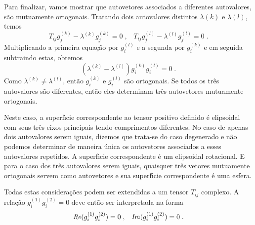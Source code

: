 Para finalizar, vamos mostrar que autovetores associados a
diferentes autovalores, s\~ao mutuamente ortogonais. Tratando dois
autovalores distintos $\lambda{(k)}$ e $\lambda{(l)}$, temos
\begin{equation}
   T_{ij} g_j^{(k)}- \lambda^{(k)} g_j^{(k)}=0 \;, \;\;\; T_{ij} g_j^{(l)}- \lambda^{(l)}
   g_j^{(l)}=0 \;.
   \label{auto_4_orto}
\end{equation}
Multiplicando a primeira equa\c{c}\~ao por $g_i^{(l)}$ e a segunda
por $g_i^{(k)}$ e em seguida subtraindo estas, obtemos
\begin{equation}
   (\lambda^{(k)}-\lambda^{(l)})g_i^{(k)}g_i^{(l)}=0 \;.
   \label{auto_4_orto1}
\end{equation}
Como $\lambda^{(k)} \neq \lambda^{(l)}$, ent\~ao $g_i^{(k)}$ e
$g_i^{(l)}$ s\~ao ortogonais. Se todos os tr\^es autovalores s\~ao
diferentes, ent\~ao eles determinam tr\^es autovetores mutuamente
ortogonais.

Neste caso, a superf\'{\i}cie correspondente ao tensor positivo
definido \'e elipsoidal com seus tr\^es eixos principais tendo
comprimentos diferentes. No caso de apenas dois autovalores serem
iguais, dizemos que trata-se do caso degenerado e n\~ao podemos
determinar de maneira \'unica os autovetores associados a esses
autovalores repetidos. A superf\'{\i}cie correspondente \'e um
elipsoidal rotacional. E para o caso dos tr\^es autovalores serem
iguais, quaisquer tr\^es vetores mutuamente ortogonais servem como
autovetores e sua superf\'{\i}cie correspondente \'e uma esfera.

Todas estas considera\c{c}\~oes podem ser extendidas a um tensor
$T_{ij}$ complexo. A rela\c{c}\~ao $g_i^{(1)}g_i^{(2)}=0$ deve
ent\~ao ser interpretada na forma
\begin{equation}
   \mathrm{\it Re}(g_i^{(1)}g_i^{(2)})=0\;, \;\;\; \mathrm{\it Im}(g_i^{(1)}g_i^{(2)})=0 \;.
   \label{auto_imag_real}
\end{equation}

